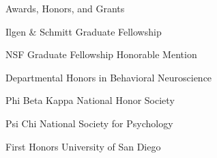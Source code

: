 
\begin{rubric}{Awards, Honors, and Grants}


	

\entry*[October 2018]
	Ilgen \& Schmitt Graduate Fellowship
	
\entry*[April 2018]
	NSF Graduate Fellowship Honorable Mention
				
\entry*[May 2016]
	Departmental Honors in Behavioral Neuroscience
	
\entry*[February 2016]
	Phi Beta Kappa National Honor Society
	
\entry*[April 2015]
	Psi Chi National Society for Psychology
	
\entry*[2012 - 2016]
	First Honors University of San Diego
	
\end{rubric}
